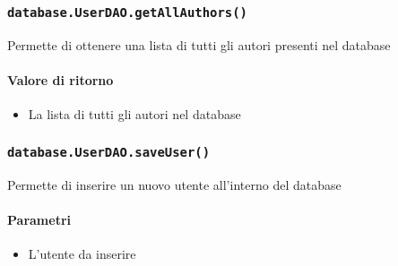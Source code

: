 \subsubsection{\texttt{database.UserDAO.getAllAuthors()}} Permette
di ottenere una lista di tutti gli autori presenti nel database
\paragraph{Valore di ritorno}
\begin{itemize}
\item La lista di tutti gli autori nel database
\end{itemize}

\subsubsection{\texttt{database.UserDAO.saveUser()}} Permette di
inserire un nuovo utente all'interno del database
\paragraph{Parametri}
\begin{itemize}
\item L'utente da inserire
\end{itemize}
    
